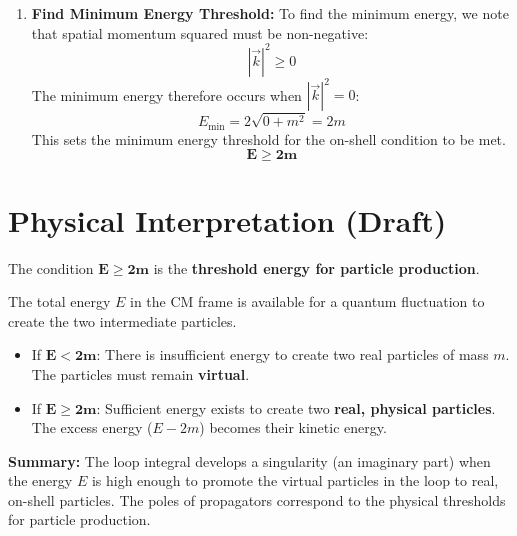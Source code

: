 \documentclass[11pt, a4paper]{article}
\begin{document}
\begin{enumerate}
    \item \textbf{Find Minimum Energy Threshold:} To find the minimum energy, we note that spatial momentum squared must be non-negative:
    $$|\vec{k}|^2 \ge 0$$
    The minimum energy therefore occurs when $|\vec{k}|^2 = 0$:
    $$E_{\text{min}} = 2\sqrt{0 + m^2} = 2m$$
    This sets the minimum energy threshold for the on-shell condition to be met.
    \[ \mathbf{E \ge 2m} \]
\end{enumerate}

\section*{Physical Interpretation (Draft)}

The condition $\mathbf{E \ge 2m}$ is the \textbf{threshold energy for particle production}.

The total energy $E$ in the CM frame is available for a quantum fluctuation to create the two intermediate particles.
\begin{itemize}
    \item If $\mathbf{E < 2m}$: There is insufficient energy to create two real particles of mass $m$. The particles must remain \textbf{virtual}.
    \item If $\mathbf{E \ge 2m}$: Sufficient energy exists to create two \textbf{real, physical particles}. The excess energy ($E - 2m$) becomes their kinetic energy.
\end{itemize}

\textbf{Summary:} The loop integral develops a singularity (an imaginary part) when the energy $E$ is high enough to promote the virtual particles in the loop to real, on-shell particles. The poles of propagators correspond to the physical thresholds for particle production.
\end{document}
